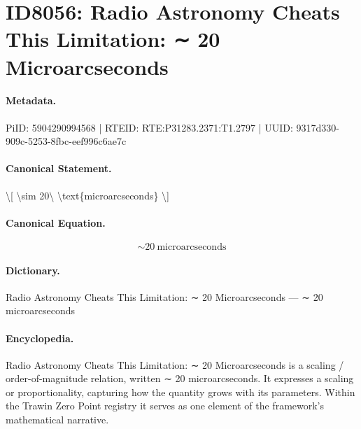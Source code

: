 \section*{ID8056: Radio Astronomy Cheats This Limitation: ∼ 20 Microarcseconds}
\paragraph{Metadata.}
PiID: 5904290994568 | RTEID: RTE:P31283.2371:T1.2797 | UUID: 9317d330-909c-5253-8fbc-eef996c6ae7c

\paragraph{Canonical Statement.}
\textbackslash{}[ \textbackslash{}sim 20\textbackslash{} \textbackslash{}text\{microarcseconds\} \textbackslash{}]

\paragraph{Canonical Equation.}
\[
\sim 20\ \text{microarcseconds}
\]

\paragraph{Dictionary.}
Radio Astronomy Cheats This Limitation: ∼ 20 Microarcseconds — ∼ 20 microarcseconds

\paragraph{Encyclopedia.}
Radio Astronomy Cheats This Limitation: ∼ 20 Microarcseconds is a scaling / order-of-magnitude relation, written ∼ 20 microarcseconds. It expresses a scaling or proportionality, capturing how the quantity grows with its parameters. Within the Trawin Zero Point registry it serves as one element of the framework's mathematical narrative.
